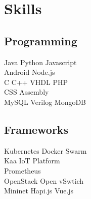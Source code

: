 \documentclass[]{deedy-resume-openfont}
\begin{document}
\begin{minipage}[t]{0.33\textwidth}
%


\section{Skills}
\subsection{Programming}
Java \textbullet{}  Python \textbullet{} Javascript \\
Android \textbullet{}  Node.js  \\
 C \textbullet{} C++ \textbullet{} VHDL \textbullet{}  PHP \\


CSS \textbullet{} Assembly \\
MySQL \textbullet{} Verilog \textbullet{} MongoDB \\

\sectionsep

\subsection{Frameworks}
Kubernetes \textbullet{} Docker \textbullet{} Swarm \\
Kaa IoT Platform \\ Prometheus \textbullet{} \\
OpenStack \textbullet{} Open vSwtich \textbullet{} \\
Mininet \textbullet{} Hapi.js \textbullet{} Vue.js
\sectionsep



\end{minipage}
\end{document}
